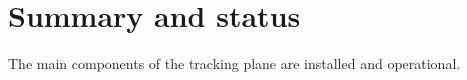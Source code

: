 \section{Summary and status}

The main components of the tracking plane are installed and operational.
